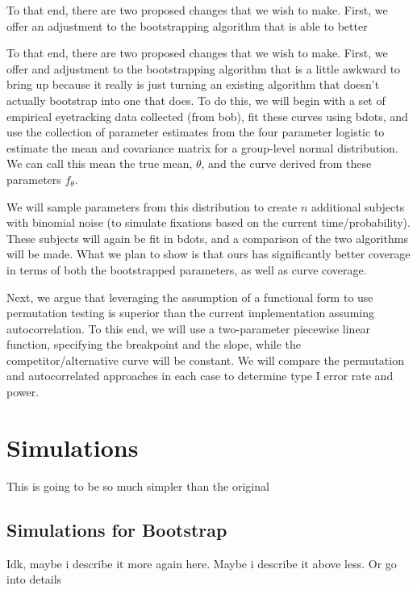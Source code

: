 \documentclass{article}
\begin{document}
To that end, there are two proposed changes that we wish to make. First, we offer an adjustment to the bootstrapping algorithm that is able to better

To that end, there are two proposed changes that we wish to make. First, we offer and adjustment to the bootstrapping algorithm that is a little awkward to bring up because it really is just turning an existing algorithm that doesn't actually bootstrap into one that does. To do this, we will begin with a set of empirical eyetracking data collected (from bob), fit these curves using bdots, and use the collection of parameter estimates from the four parameter logistic to estimate the mean and covariance matrix for a group-level normal distribution. We can call this mean the true mean, $\theta$, and the curve derived from these parameters $f_{\theta}$.

We will sample parameters from this distribution to create $n$ additional subjects with binomial noise (to simulate fixations based on the current time/probability). These subjects will again be fit in bdots, and a comparison of the two algorithms will be made. What we plan to show is that ours has significantly better coverage in terms of both the bootstrapped parameters, as well as curve coverage.

Next, we argue that leveraging the assumption of a functional form to use permutation testing is superior than the current implementation assuming autocorrelation. To this end, we will use a two-parameter piecewise linear function, specifying the breakpoint and the slope, while the competitor/alternative curve will be constant. We will compare the permutation and autocorrelated approaches in each case to determine type I error rate and power. 

\section{Simulations}

This is going to be so much simpler than the original

\subsection{Simulations for Bootstrap}

Idk, maybe i describe it more again here. Maybe i describe it above less. Or go into details
\end{document}
